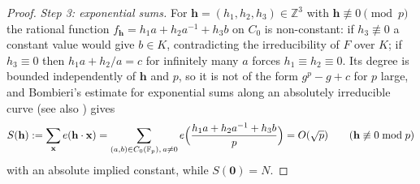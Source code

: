 \documentclass[11pt]{article}
\theoremstyle{remark}
\newcommand{\Fp}{\mathbb{F}_p}
\newcommand{\Z}{\mathbb{Z}}
\begin{document}
\begin{proof}
\emph{Step 3: exponential sums.}  For $\mathbf h=(h_1,h_2,h_3)\in\Z^3$ with $\mathbf h\not\equiv0\pmod p$ the rational function
$f_{\mathbf h}=h_1a+h_2a^{-1}+h_3b$ on $C_0$ is non-constant: if $h_3\not\equiv0$ a constant value would give $b\in K$, contradicting
the irreducibility of $F$ over $K$; if $h_3\equiv0$ then $h_1a+h_2/a=c$ for infinitely many $a$ forces $h_1\equiv h_2\equiv0$.  Its degree
is bounded independently of $\mathbf h$ and $p$, so it is not of the form $g^p-g+c$ for $p$ large, and Bombieri's estimate for
exponential sums along an absolutely irreducible curve \cite{Bombieri66} (see also \cite[Ch.~11]{IK}) gives
\[
 S(\mathbf h):=\sum_{\mathbf x}e(\mathbf h\cdot\mathbf x)=\sum_{(a,b)\in C_0(\Fp),\,a\ne0}e\Bigl(\frac{h_1a+h_2a^{-1}+h_3b}{p}\Bigr)=O(\sqrt p)
 \qquad(\mathbf h\not\equiv0\bmod p)
\]
with an absolute implied constant, while $S(\mathbf 0)=N$.


\end{proof}
\end{document}
